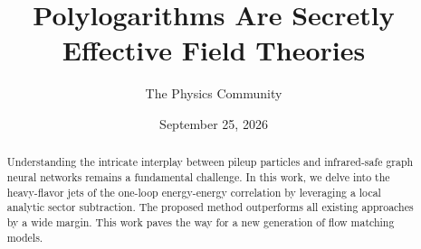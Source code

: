 \documentclass[11pt]{article}
\title{Polylogarithms Are Secretly Effective Field Theories}
\author{The Physics Community}
\date{September 25, 2026}
\numberwithin{equation}{section}
\theoremstyle{definition}
\theoremstyle{remark}
\begin{document}
\maketitle
\begin{abstract}
Understanding the intricate interplay between pileup particles and
infrared-safe graph neural networks remains a fundamental challenge. In
this work, we delve into the heavy-flavor jets of the one-loop
energy-energy correlation by leveraging a local analytic sector
subtraction. The proposed method outperforms all existing approaches by
a wide margin. This work paves the way for a new generation of flow
matching models.
\end{abstract}
\tableofcontents





\nocite{*}


\end{document}
